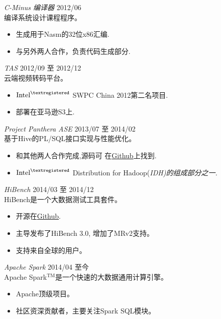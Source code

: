 \documentclass[line,margin]{res}
\begin{document}
\begin{resume}
                {\sl C-Minus 编译器} \hfill        2012/06 \\
                编译系统设计课程程序。
                  \begin{itemize}
                   \item 生成用于Nasm的32位x86汇编.
                   \item 与另外两人合作，负责代码生成部分.
                   \end{itemize}
                {\sl TAS} \hfill        2012/09 至 2012/12\\
                云端视频转码平台。
                  \begin{itemize}
                   \item $\textrm{Intel}^{\textregistered}$ SWPC China 2012第二名项目.
                   \item 部署在亚马逊S3上.
                   \end{itemize}
                   
                {\sl Project Panthera ASE} \hfill            2013/07 至 2014/02 \\
                基于Hive的PL/SQL接口实现与性能优化。
                 \begin{itemize}  \itemsep -2pt %
                 \item 和其他两人合作完成,源码可
                     在\href{https://github.com/intel-hadoop/project-panthera}{Github}上找到.
                 \item $\textrm{Intel}^{\textregistered}$ Distribution for Hadoop(\sl IDH)的组成部分之一.
                 \end{itemize}

                {\sl HiBench} \hfill        2014/03 至 2014/12 \\
                HiBench是一个大数据测试工具套件。
                  \begin{itemize}
                   \item 开源在\href{https://github.com/intel-hadoop/HiBench}{Github}.
                   \item 主导发布了HiBench 3.0, 增加了MRv2支持。
                   \item 支持来自全球的用户。
                   \end{itemize}

                {\sl Apache Spark} \hfill        2014/04 至今\\
                Apache Spark$^{\textrm{TM}}$是一个快速的大数据通用计算引擎。
                  \begin{itemize}
                   \item Apache顶级项目。
                   \item 社区资深贡献者，主要关注Spark SQL模块。
                   \end{itemize}


\end{resume}
\end{document}

